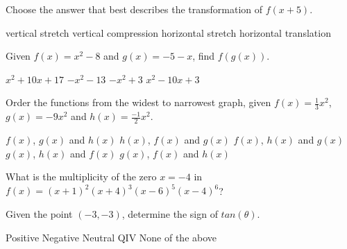 \documentclass[../main.tex]{subfiles}
\begin{document}
\begin{questions}
    \question[1] Choose the answer that best describes the transformation of $f(x+5)$.
    
    \begin{oneparchoices}
        \choice vertical stretch
        \choice vertical compression
        \choice horizontal stretch
        \choice horizontal translation
        \end{oneparchoices}  \answerline
    
    \question[1] Given $f(x) = x^2 - 8$ and $g(x) = -5 - x$, find $f(g(x))$.
    
    \begin{oneparchoices}
        \choice $x^2 + 10x + 17$
        \choice $-x^2 - 13$
        \choice $-x^2 + 3$
        \choice $x^2 - 10x + 3$
        \end{oneparchoices}  \answerline
    
    \question[1] Order the functions from the widest to narrowest graph, given $f(x) = \frac{1}{3}x^2$, $g(x) = -9x^2$ and $h(x) = \frac{-1}{2}x^2$.
    
    \begin{oneparchoices}
        \choice $f(x)$, $g(x)$ and $h(x)$
        \choice $h(x)$, $f(x)$ and $g(x)$
        \choice $f(x)$, $h(x)$ and $g(x)$
        \choice $g(x)$, $h(x)$ and $f(x)$
        \choice $g(x)$, $f(x)$ and $h(x)$
        \end{oneparchoices}  \answerline
        \newpage
    
    \question[1] What is the multiplicity of the zero $x = -4$ in $f(x) = (x+1)^2 (x+4)^3 (x-6)^5 (x-4)^6$?
    
    \begin{oneparchoices}
        \end{oneparchoices}  \answerline
    
    \question[1] Given the point $(-3, -3)$, determine the sign of $tan(\theta)$.
    
    \begin{oneparchoices}
        \choice Positive
        \choice Negative
        \choice Neutral
        \choice QIV
        \choice None of the above
        \end{oneparchoices}  \answerline
    

\end{questions}
\end{document}
